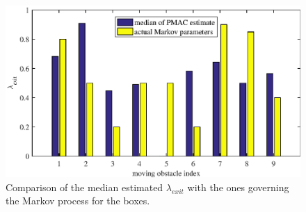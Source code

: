 \begin{figure}
    \centering
    \includegraphics[scale=1]{chapters/evaluation/figures/compare_learned_markov_exit}
    \caption{Comparison of the median estimated $\lambda_{exit}$ with the ones governing the Markov process for the boxes.}
    \label{fig:compare_learned_markov_exit}
\end{figure}